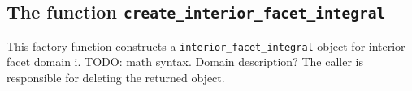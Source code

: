 
\subsection{The function \texttt{create\_interior\_facet\_integral}}
This factory function constructs a \texttt{interior\_facet\_integral} object for interior facet domain i.
TODO: math syntax. Domain description?
The caller is responsible for deleting the returned object.





